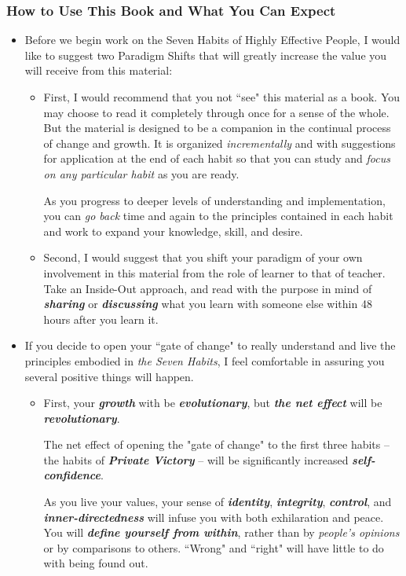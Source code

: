 \documentclass[11pt]{article}
\begin{document}
\subsubsection{How to Use This Book and What You Can Expect}
\begin{itemize}
\item Before we begin work on the Seven Habits of Highly Effective People, I would like to suggest two
Paradigm Shifts that will greatly increase the value you will receive from this material:
\begin{itemize}
\item First, I would recommend that you not ``see" this material as a book.  You may choose to read it completely through once for a sense of the whole. But the material is designed to be a companion in the continual process of change and growth. It is organized
\emph{incrementally} and with suggestions for application at the end of each habit so that you can study and
\emph{focus on any particular habit} as you are ready.

As you progress to deeper levels of understanding and implementation, you can \emph{go back} time and again to the principles contained in each habit and work to expand your knowledge, skill, and desire.

\item Second, I would suggest that you shift your paradigm of your own involvement in this material
from the role of learner to that of teacher. Take an Inside-Out approach, and read with the purpose in
mind of \emph{\textbf{sharing}} or \emph{\textbf{discussing}} what you learn with someone else within 48 hours after you learn it.
\end{itemize}

\item If you decide to open your ``gate of change" to really understand and live the principles embodied in
\emph{the Seven Habits}, I feel comfortable in assuring you several positive things will happen.
\begin{itemize}
\item First, your \emph{\textbf{growth}} with be \emph{\textbf{evolutionary}}, but \emph{\textbf{the net effect}} will be \emph{\textbf{revolutionary}}. 

The net effect of opening the "gate of change" to the first three habits -- the habits of \emph{\textbf{Private Victory}} -- will be significantly increased \emph{\textbf{self-confidence}}. 

As you live your values, your sense of \emph{\textbf{identity}}, \emph{\textbf{integrity}}, \emph{\textbf{control}}, and \emph{\textbf{inner-directedness}} will infuse you with both exhilaration and peace. You will \emph{\textbf{define yourself from within}}, rather than by \emph{people's opinions} or by comparisons to others. ``Wrong" and ``right" will have little to do with being found out.


\end{itemize}
\end{itemize}
\end{document}
